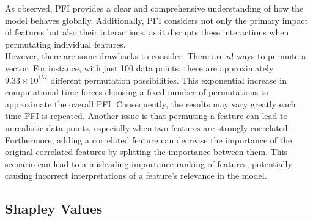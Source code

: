 As observed, PFI provides a clear and comprehensive understanding of how the model behaves globally. Additionally, PFI considers not only the primary impact of features but also their interactions, as it disrupts these interactions when permutating individual features.\\
However, there are some drawbacks to consider. There are $n!$ ways to permute a vector. For instance, with just 100 data points, there are approximately $9.33 \times 10^{157}$ different permutation possibilities. This exponential increase in computational time forces choosing a fixed number of permutations to approximate the overall PFI. Consequently, the results may vary greatly each time PFI is repeated.
Another issue is that permuting a feature can lead to unrealistic data points, especially when two features are strongly correlated. 
Furthermore, adding a correlated feature can decrease the importance of the original correlated features by splitting the importance between them. This scenario can lead to a misleading importance ranking of features, potentially causing incorrect interpretations of a feature's relevance in the model.

\subsection{Shapley Values}

